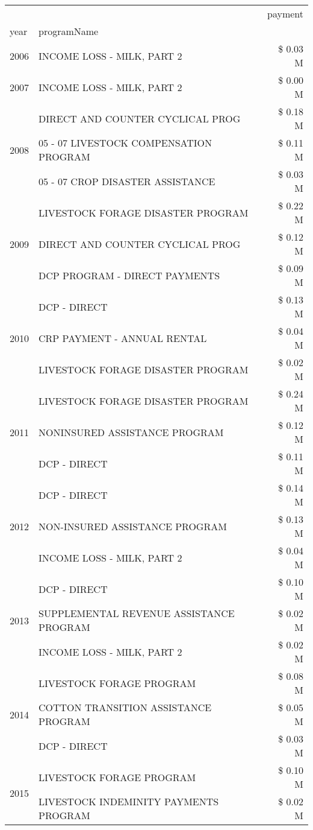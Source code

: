 \begin{tabular}{llr}
\toprule
 &  & payment \\
year & programName &  \\
\midrule
2006 & INCOME LOSS - MILK, PART 2 & \$ 0.03 M \\
\cline{1-3}
2007 & INCOME LOSS - MILK, PART 2 & \$ 0.00 M \\
\cline{1-3}
\multirow[t]{3}{*}{2008} & DIRECT AND COUNTER CYCLICAL PROG & \$ 0.18 M \\
 & 05 - 07 LIVESTOCK COMPENSATION PROGRAM & \$ 0.11 M \\
 & 05 - 07 CROP DISASTER ASSISTANCE & \$ 0.03 M \\
\cline{1-3}
\multirow[t]{3}{*}{2009} & LIVESTOCK FORAGE DISASTER  PROGRAM & \$ 0.22 M \\
 & DIRECT AND COUNTER CYCLICAL PROG & \$ 0.12 M \\
 & DCP PROGRAM - DIRECT PAYMENTS & \$ 0.09 M \\
\cline{1-3}
\multirow[t]{3}{*}{2010} & DCP - DIRECT & \$ 0.13 M \\
 & CRP PAYMENT - ANNUAL RENTAL & \$ 0.04 M \\
 & LIVESTOCK FORAGE DISASTER PROGRAM & \$ 0.02 M \\
\cline{1-3}
\multirow[t]{3}{*}{2011} & LIVESTOCK FORAGE DISASTER PROGRAM & \$ 0.24 M \\
 & NONINSURED ASSISTANCE PROGRAM & \$ 0.12 M \\
 & DCP - DIRECT & \$ 0.11 M \\
\cline{1-3}
\multirow[t]{3}{*}{2012} & DCP - DIRECT & \$ 0.14 M \\
 & NON-INSURED ASSISTANCE PROGRAM & \$ 0.13 M \\
 & INCOME LOSS - MILK, PART 2 & \$ 0.04 M \\
\cline{1-3}
\multirow[t]{3}{*}{2013} & DCP - DIRECT & \$ 0.10 M \\
 & SUPPLEMENTAL REVENUE ASSISTANCE PROGRAM & \$ 0.02 M \\
 & INCOME LOSS - MILK, PART 2 & \$ 0.02 M \\
\cline{1-3}
\multirow[t]{3}{*}{2014} & LIVESTOCK FORAGE PROGRAM & \$ 0.08 M \\
 & COTTON TRANSITION ASSISTANCE PROGRAM & \$ 0.05 M \\
 & DCP - DIRECT & \$ 0.03 M \\
\cline{1-3}
\multirow[t]{3}{*}{2015} & LIVESTOCK FORAGE PROGRAM & \$ 0.10 M \\
 & LIVESTOCK INDEMINITY PAYMENTS PROGRAM & \$ 0.02 M \\

\end{tabular}
